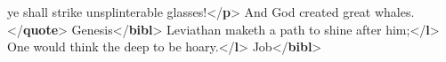 \begin{shaded}
\hspace*{1em}\hspace*{1em} ye shall strike unsplinterable glasses!{</\textbf{p}>}\mbox{}\newline 
{}\mbox{}\newline 
\hspace*{1em}\mbox{}\newline 
\hspace*{1em}\hspace*{1em}And God created great whales.{</\textbf{quote}>}\mbox{}\newline 
\hspace*{1em}\hspace*{1em}Genesis{</\textbf{bibl}>}\mbox{}\newline 
\hspace*{1em}\mbox{}\newline 
\hspace*{1em}\mbox{}\newline 
\hspace*{1em}\hspace*{1em}\mbox{}\newline 
\hspace*{1em}\hspace*{1em}\hspace*{1em}Leviathan maketh a path to shine after him;{</\textbf{l}>}\mbox{}\newline 
\hspace*{1em}\hspace*{1em}\hspace*{1em}One would think the deep to be hoary.{</\textbf{l}>}\mbox{}\newline 
\hspace*{1em}\hspace*{1em}\mbox{}\newline 
\hspace*{1em}\hspace*{1em}Job{</\textbf{bibl}>}\mbox{}\newline 

\end{shaded}
